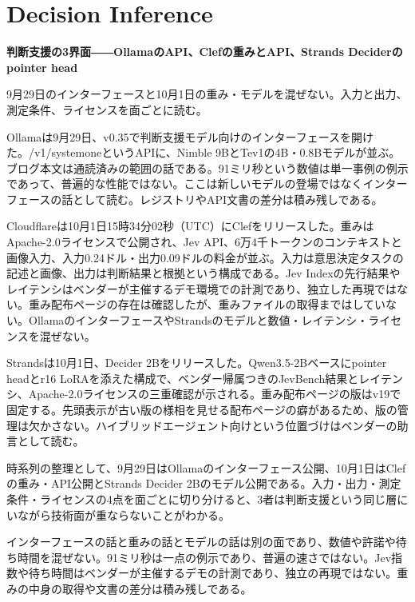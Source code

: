 \section{Decision Inference}
\begin{wideflow}
{\Large\bfseries 判断支援の3界面――OllamaのAPI、Clefの重みとAPI、Strands Deciderのpointer head}\par
\smallskip
{\color{SurveyMuted}9月29日のインターフェースと10月1日の重み・モデルを混ぜない。入力と出力、測定条件、ライセンスを面ごとに読む。}\par
\end{wideflow}

Ollamaは9月29日、v0.35で判断支援モデル向けのインターフェースを開けた\cite{ollama}。/v1/systemoneというAPIに、Nimble 9BとTev1の4B・0.8Bモデルが並ぶ。ブログ本文は通読済みの範囲の話である。91ミリ秒という数値は単一事例の例示であって、普遍的な性能ではない。ここは新しいモデルの登場ではなくインターフェースの話として読む。レジストリやAPI文書の差分は積み残しである。

Cloudflareは10月1日15時34分02秒（UTC）にClefをリリースした\cite{clef}。重みはApache-2.0ライセンスで公開され、Jev API、6万4千トークンのコンテキストと画像入力、入力0.24ドル・出力0.09ドルの料金が並ぶ。入力は意思決定タスクの記述と画像、出力は判断結果と根拠という構成である。Jev Indexの先行結果やレイテンシはベンダーが主催するデモ環境での計測であり、独立した再現ではない。重み配布ページの存在は確認したが、重みファイルの取得まではしていない。OllamaのインターフェースやStrandsのモデルと数値・レイテンシ・ライセンスを混ぜない。

Strandsは10月1日、Decider 2Bをリリースした\cite{strands}。Qwen3.5-2Bベースにpointer headとr16 LoRAを添えた構成で、ベンダー帰属つきのJevBench結果とレイテンシ、Apache-2.0ライセンスの三重確認が示される。重み配布ページの版はv19で固定する。先頭表示が古い版の様相を見せる配布ページの癖があるため、版の管理は欠かさない。ハイブリッドエージェント向けという位置づけはベンダーの助言として読む。

時系列の整理として、9月29日はOllamaのインターフェース公開、10月1日はClefの重み・API公開とStrands Decider 2Bのモデル公開である。入力・出力・測定条件・ライセンスの4点を面ごとに切り分けると、3者は判断支援という同じ層にいながら技術面が重ならないことがわかる。

\begin{claimboundary}[資料と評価の境界]
インターフェースの話と重みの話とモデルの話は別の面であり、数値や許諾や待ち時間を混ぜない。91ミリ秒は一点の例示であり、普遍の速さではない。Jev指数や待ち時間はベンダーが主催するデモの計測であり、独立の再現ではない。重みの中身の取得や文書の差分は積み残しである。
\end{claimboundary}

